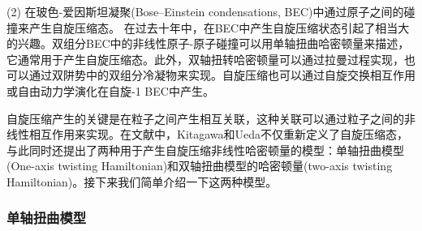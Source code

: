 (2) 在玻色-爱因斯坦凝聚(Bose–Einstein condensations, BEC)中通过原子之间的碰撞来产生自旋压缩态。
在过去十年中，在BEC中产生自旋压缩状态引起了相当大的兴趣。双组分BEC中的非线性原子-原子碰撞可以用单轴扭曲哈密顿量来描述，它通常用于产生自旋压缩态。此外，双轴扭转哈密顿量可以通过拉曼过程实现，也可以通过双阱势中的双组分冷凝物来实现。自旋压缩也可以通过自旋交换相互作用或自由动力学演化在自旋-1 BEC中产生。

自旋压缩产生的关键是在粒子之间产生相互关联，这种关联可以通过粒子之间的非线性相互作用来实现。在文献\cite{PRA1993Kitagawa}中，Kitagawa和Ueda不仅重新定义了自旋压缩态，与此同时还提出了两种用于产生自旋压缩非线性哈密顿量的模型：单轴扭曲模型(One-axis twisting Hamiltonian)和双轴扭曲模型的哈密顿量(two-axis twisting Hamiltonian)。接下来我们简单介绍一下这两种模型。

\subsubsection{单轴扭曲模型}

